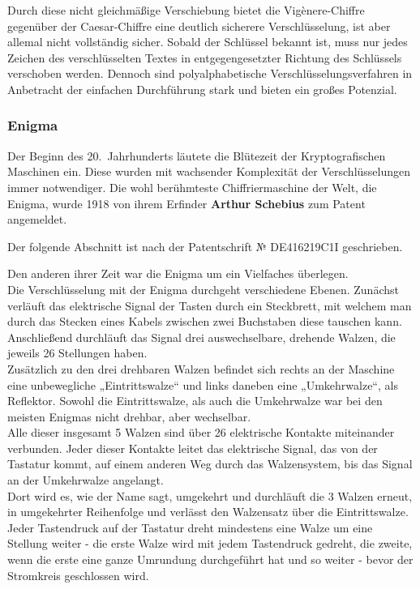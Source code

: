 
Durch diese nicht gleichmäßige Verschiebung bietet die Vigènere-Chiffre gegenüber der Caesar-Chiffre eine deutlich sicherere Verschlüsselung, ist aber allemal nicht vollständig sicher.
Sobald der Schlüssel bekannt ist, muss nur jedes Zeichen des verschlüsselten Textes in entgegengesetzter Richtung des Schlüssels verschoben werden.
Dennoch sind polyalphabetische Verschlüsselungsverfahren in Anbetracht der einfachen Durchführung stark und bieten ein großes Potenzial.

\subsubsection{Enigma}\label{subsubsec:enigma}
Der Beginn des 20.\ Jahrhunderts läutete die Blütezeit der Kryptografischen Maschinen ein.
Diese wurden mit wachsender Komplexität der Verschlüsselungen immer notwendiger.
Die wohl berühmteste Chiffriermaschine der Welt, die Enigma, wurde 1918 von ihrem Erfinder \textbf{Arthur Schebius} zum Patent angemeldet\autocite{enigma_patent}.

Der folgende Abschnitt ist nach der Patentschrift № DE\nobreakdash416219C1\nobreakdash\RN{1}\autocite{enigma_patent} geschrieben.

Den anderen  ihrer Zeit war die Enigma um ein Vielfaches überlegen.\\
Die Verschlüsselung mit der Enigma durchgeht verschiedene Ebenen.
Zunächst verläuft das elektrische Signal der Tasten durch ein Steckbrett, mit welchem man durch das Stecken eines Kabels zwischen zwei Buchstaben diese tauschen kann.
Anschließend durchläuft das Signal drei auswechselbare, drehende Walzen, die jeweils 26 Stellungen haben.\\
Zusätzlich zu den drei drehbaren Walzen befindet sich rechts an der Maschine eine unbewegliche „Eintrittswalze“ und links daneben eine „Umkehrwalze“, als Reflektor.
Sowohl die Eintrittswalze, als auch die Umkehrwalze war bei den meisten Enigmas nicht drehbar, aber wechselbar.\\
Alle dieser insgesamt 5 Walzen sind über 26 elektrische Kontakte miteinander verbunden.
Jeder dieser Kontakte leitet das elektrische Signal, das von der Tastatur kommt, auf einem anderen Weg durch das Walzensystem, bis das Signal an der Umkehrwalze angelangt.\\
Dort wird es, wie der Name sagt, umgekehrt und durchläuft die 3 Walzen erneut, in umgekehrter Reihenfolge und verlässt den Walzensatz über die Eintrittswalze.
Jeder Tastendruck auf der Tastatur dreht mindestens eine Walze um eine Stellung weiter - die erste Walze wird mit jedem Tastendruck gedreht, die zweite, wenn die erste eine ganze Umrundung durchgeführt hat und so weiter - bevor der Stromkreis geschlossen wird.\autocite[]{enigma_patent}


